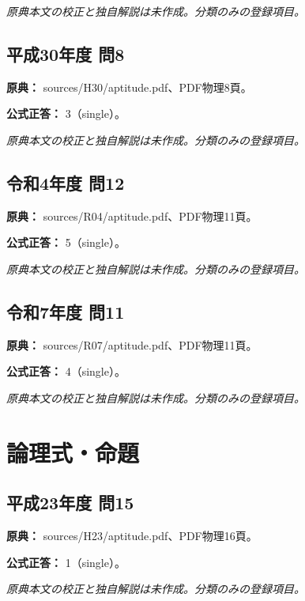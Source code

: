 \par\textit{原典本文の校正と独自解説は未作成。分類のみの登録項目。}

\subsection{平成30年度 問8}
\label{q:h30-reg-apt-08}

\noindent\textbf{原典：} sources/H30/aptitude.pdf、PDF物理8頁。

\textbf{公式正答：} 3（single）。

\par\textit{原典本文の校正と独自解説は未作成。分類のみの登録項目。}

\subsection{令和4年度 問12}
\label{q:r04-reg-apt-12}

\noindent\textbf{原典：} sources/R04/aptitude.pdf、PDF物理11頁。

\textbf{公式正答：} 5（single）。

\par\textit{原典本文の校正と独自解説は未作成。分類のみの登録項目。}

\subsection{令和7年度 問11}
\label{q:r07-reg-apt-11}

\noindent\textbf{原典：} sources/R07/aptitude.pdf、PDF物理11頁。

\textbf{公式正答：} 4（single）。

\par\textit{原典本文の校正と独自解説は未作成。分類のみの登録項目。}

\section{論理式・命題}

\subsection{平成23年度 問15}
\label{q:h23-reg-apt-15}

\noindent\textbf{原典：} sources/H23/aptitude.pdf、PDF物理16頁。

\textbf{公式正答：} 1（single）。

\par\textit{原典本文の校正と独自解説は未作成。分類のみの登録項目。}

